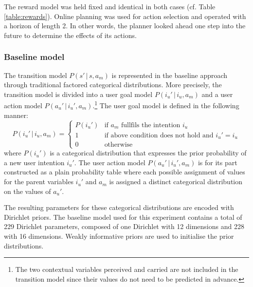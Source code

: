 The reward model was held fixed and identical in both cases (cf. Table \ref{table:rewards}). Online planning was used for action selection and operated with a horizon of length 2. In other words, the planner looked ahead one step into the future to determine the effects of its actions.  




\subsubsection*{Baseline model}

The transition model $P(s'\, | \, s, a_m)$ is represented in the baseline approach through traditional factored categorical distributions. More precisely, the transition model is divided into a user goal model $P(i_u'\, | \, i_u, a_m)$ and a user action model $P(a_u' \, | \, i_u',a_m)$.\footnote{The two contextual variables $\mathrm{perceived}$ and $\mathrm{carried}$ are not included in the transition model since their values do not need to be predicted in advance.} The user goal model is defined in the following manner:
\begin{equation}
P(i_u' \, | \, i_u, a_m) = \begin{cases}
P(i_u') & \text{if } a_m \text{ fullfils the intention } i_u \\
1 & \text{if above condition does not hold and } i_u' = i_u \\
0 & \text{otherwise} \end{cases} \nonumber
\end{equation}
where $P(i_u')$ is a categorical distribution that expresses the prior probability of a new user intention $i_u'$. The user action model $P(a_u' \, | \, i_u',a_m)$ is for its part constructed as a plain probability table where each possible assignment of values for the parent variables $i_u'$ and $a_m$ is assigned a distinct categorical distribution on the values of $a_u'$. 

The resulting parameters for these categorical distributions are encoded with Dirichlet priors.  The baseline model used for this experiment contains a total of 229 Dirichlet parameters, composed of one Dirichlet with 12 dimensions and 228 with 16 dimensions.  Weakly informative priors are used to initialise the prior distributions.

